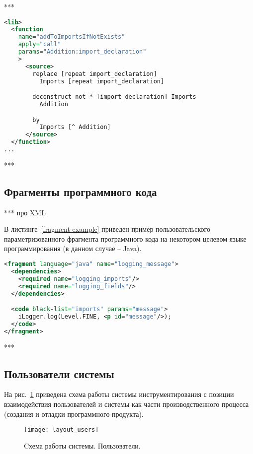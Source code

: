 ***

\begin{lstlisting}[frame=single, language=XML, label={annotation-lib-example}, caption={Пример}]
<lib>
  <function
    name="addToImportsIfNotExists"
    apply="call"
    params="Addition:import_declaration"
    >
      <source>
        replace [repeat import_declaration]
          Imports [repeat import_declaration]

        deconstruct not * [import_declaration] Imports
          Addition

        by
          Imports [^ Addition]
      </source>
  </function>
...
\end{lstlisting}

***

\subsection{Фрагменты программного кода}

***
про XML

В листинге~\ref{fragment-example} приведен пример пользовательского параметризованного фрагмента программного кода на некотором целевом языке программирования (в данном случае -- Java).

\begin{lstlisting}[frame=single, language=XML, label={fragment-example}, caption={Пример пользовательского фрагмента}]
<fragment language="java" name="logging_message">
  <dependencies>
    <required name="logging_imports"/>
    <required name="logging_fields"/>
  </dependencies>

  <code black-list="imports" params="message">
    iLogger.log(Level.FINE, <p id="message"/>);
  </code>
</fragment>
\end{lstlisting}

***

\subsection{Пользователи системы}

На рис.~\ref{fig:layout_users} приведена схема работы системы инструментирования с позиции взаимодействия пользователей и системы как части производственного процесса (создания и отладки программного продукта).

\begin{figure}[h]
	\centering
	\texttt{[image: layout\_users]}
	\caption{Cхема работы системы. Пользователи.}
	\label{fig:layout_users}
\end{figure}

